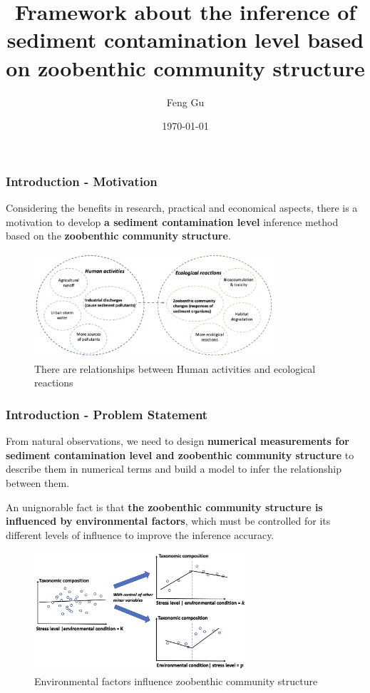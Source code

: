 \documentclass{beamer}
\title{Framework about the inference of sediment contamination level based on zoobenthic community structure}
\author{Feng Gu}
\date{\today}
\begin{document}
\frame{\titlepage}

\begin{frame}
\frametitle{Introduction - Motivation}

Considering the benefits in research, practical and economical aspects, 
there is a motivation to develop \textbf{a sediment contamination level} inference method 
based on the \textbf{zoobenthic community structure}.


\begin{figure}
\centering
\includegraphics[width=0.8\textwidth]{figures/p1_human_activities_vs_ecological_reactions.png}
\caption{There are relationships between Human activities and ecological reactions}
\end{figure}

\end{frame}

\begin{frame}

\frametitle{Introduction - Problem Statement}
From natural observations, we need to design \textbf{numerical measurements for sediment contamination level and 
zoobenthic community structure} to describe them in numerical terms and 
build a model to infer the relationship between them.

An unignorable fact is that
\textbf{the zoobenthic community structure is influenced by environmental factors},
which must be controlled for its different levels of influence to improve the inference accuracy.


\begin{figure}
\centering
\includegraphics[width=0.7\textwidth]{figures/p2_control_vs_no_control_of_environment.png}
\caption{Environmental factors influence zoobenthic community structure}
\end{figure}

\end{frame}
\end{document}
